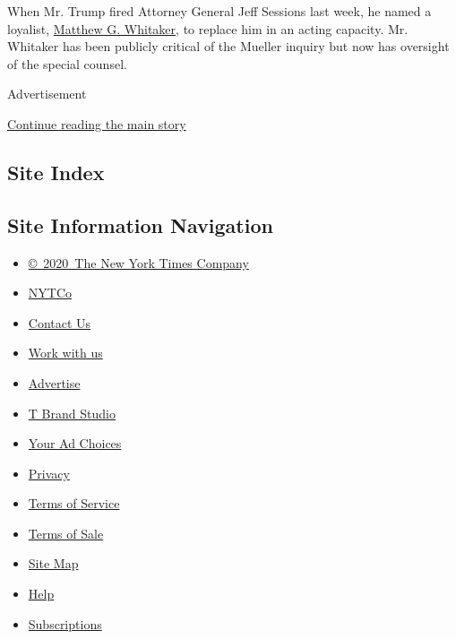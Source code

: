 When Mr. Trump fired Attorney General Jeff Sessions last week, he named
a loyalist,
\href{https://www.nytimes.com/2018/11/08/us/politics/mueller-investigation-matt-whitaker.html}{Matthew
G. Whitaker}, to replace him in an acting capacity. Mr. Whitaker has
been publicly critical of the Mueller inquiry but now has oversight of
the special counsel.

Advertisement

\protect\hyperlink{after-bottom}{Continue reading the main story}

\hypertarget{site-index}{%
\subsection{Site Index}\label{site-index}}

\hypertarget{site-information-navigation}{%
\subsection{Site Information
Navigation}\label{site-information-navigation}}

\begin{itemize}
\tightlist
\item
  \href{https://help.nytimes.com/hc/en-us/articles/115014792127-Copyright-notice}{©~2020~The
  New York Times Company}
\end{itemize}

\begin{itemize}
\tightlist
\item
  \href{https://www.nytco.com/}{NYTCo}
\item
  \href{https://help.nytimes.com/hc/en-us/articles/115015385887-Contact-Us}{Contact
  Us}
\item
  \href{https://www.nytco.com/careers/}{Work with us}
\item
  \href{https://nytmediakit.com/}{Advertise}
\item
  \href{http://www.tbrandstudio.com/}{T Brand Studio}
\item
  \href{https://www.nytimes.com/privacy/cookie-policy\#how-do-i-manage-trackers}{Your
  Ad Choices}
\item
  \href{https://www.nytimes.com/privacy}{Privacy}
\item
  \href{https://help.nytimes.com/hc/en-us/articles/115014893428-Terms-of-service}{Terms
  of Service}
\item
  \href{https://help.nytimes.com/hc/en-us/articles/115014893968-Terms-of-sale}{Terms
  of Sale}
\item
  \href{https://spiderbites.nytimes.com}{Site Map}
\item
  \href{https://help.nytimes.com/hc/en-us}{Help}
\item
  \href{https://www.nytimes.com/subscription?campaignId=37WXW}{Subscriptions}
\end{itemize}
